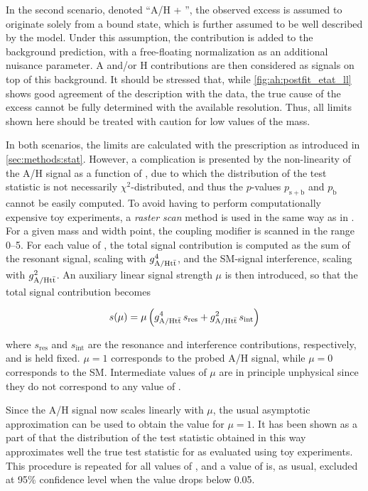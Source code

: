 In the second scenario, denoted ``A/H + \etat'', the observed excess is assumed to originate solely from a \ttbar bound state, which is further assumed to be well described by the \etat model. Under this assumption, the \etat contribution is added to the \ttbar background prediction, with a free-floating normalization as an additional nuisance parameter. A and/or H contributions are then considered as signals on top of this background. It should be stressed that, while \cref{fig:ah:postfit_etat_ll} shows good agreement of the \etat description with the data, the true cause of the excess cannot be fully determined with the available \mtt resolution. Thus, all limits shown here should be treated with caution for low values of the \AH mass.

In both scenarios, the limits are calculated with the \CLs prescription as introduced in \cref{sec:methods:stat}. However, a complication is presented by the non-linearity of the A/H signal as a function of \gAHtt, due to which the distribution of the test statistic is not necessarily $\chi^2$-distributed, and thus the $p$-values $p_{\mathrm{s+b}}$ and $p_{\mathrm{b}}$ cannot be easily computed. To avoid having to perform computationally expensive toy experiments, a \textit{raster scan} method is used in the same way as in . For a given \AH mass and width point, the coupling modifier \gAHtt is scanned in the range 0--5. For each value of \gAHtt, the total signal contribution is computed as the sum of the resonant signal, scaling with $g_{\mathrm{A/H t \bar{t}}}^4$, and the SM-signal interference, scaling with $g_{\mathrm{A/H t \bar{t}}}^2$. An auxiliary linear signal strength $\mu$ is then introduced, so that the total signal contribution becomes

\begin{equation}
    s (\mu) = \mu \left( g_{\mathrm{A/H t \bar{t}}}^4 \, s_{\mathrm{res}} + g_{\mathrm{A/H t \bar{t}}}^2 \, s_{\mathrm{int}} \right)
\end{equation}

\noindent where $s_{\mathrm{res}}$ and $s_{\mathrm{int}}$ are the resonance and interference contributions, respectively, and \gAHtt is held fixed. $\mu = 1$ corresponds to the probed A/H signal, while $\mu = 0$ corresponds to the SM. Intermediate values of $\mu$ are in principle unphysical since they do not correspond to any value of \gAHtt.

Since the A/H signal now scales linearly with $\mu$, the usual asymptotic approximation can be used to obtain the \CLs value for $\mu = 1$. It has been shown as a part of  that the distribution of the test statistic obtained in this way approximates well the true test statistic for \gAHtt as evaluated using toy experiments. This procedure is repeated for all values of \gAHtt, and a value of \gAHtt is, as usual, excluded at 95\% confidence level when the \CLs value drops below 0.05. 

